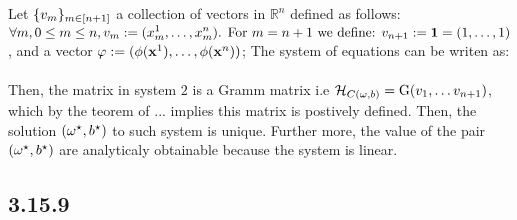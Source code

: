 \documentclass{exam}
\begin{document}
Let $\displaystyle\{ v_m \}_{\tiny m \in \left[ n + 1 \right]}$ a collection of vectors in $\mathbb{R}^n$ defined as follows: $ \forall m, 0 \leq m \leq n, v_m := \displaystyle(x^{1}_{m}, \ldots ,x^{n}_{m}) \text{. For } m = n+1 \text{ we define: }v_{n+1} := \bold{1} = (1, \ldots ,1)$, and a vector $\bold{\varphi} := (\phi(\bold{x}^{1}), \ldots , \phi(\bold{x}^{n}))$; The system of equations 
can be writen as:\\
\\
Then, the matrix in system $2$ is a Gramm matrix i.e $\mathcal{H}_{C(\tiny \omega, b)} = \text{G}(v_1, \ldots v_{n+1})$, which by the teorem of ... implies this matrix is postively defined. Then, the solution $(\bold{\omega}^{\star}, b^{\star})$ to such system is unique. Further more, the value of the pair $(\bold{\omega}^{\star}, b^{\star})$ are analyticaly obtainable because 
the system is linear. 
\subsection*{3.15.9}
\end{document}
